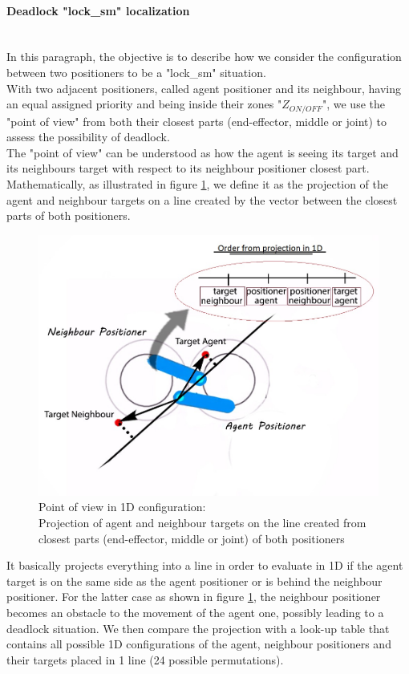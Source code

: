 \documentclass[]{spie}  %
\begin{document}
	\paragraph{Deadlock "lock\_sm" localization}\mbox{}\\
	In this paragraph, the objective is to describe how we consider the configuration between two positioners to be a "lock\_sm" situation.\\
	With two adjacent positioners, called agent positioner and its neighbour, having an equal assigned priority and being inside their zones "$Z_{ON/OFF}$", we use the "point of view" from both their closest parts (end-effector, middle or joint) to assess the possibility of deadlock.\\
	The "point of view" can be understood as how the agent is seeing its target and its neighbours target with respect to its neighbour positioner closest part.
	Mathematically, as illustrated in figure \ref{projection},  we define it as the projection of the agent and neighbour targets on a line created by the vector between the closest parts of both positioners.\\
	\begin{figure}[H]
		\centering
		\includegraphics[scale=0.35]{images/Projection1.jpg}
		\caption{\centering Point of view in 1D configuration:\\
			 Projection of agent and neighbour targets on the line created from closest parts (end-effector, middle or joint) of both positioners}
		\label{projection}
	\end{figure}
	It basically projects everything into a line in order to evaluate in 1D if the agent target is on the same side as the agent positioner or is behind the neighbour positioner. For the latter case as shown in figure \ref{projection}, the neighbour positioner becomes an obstacle to the movement of the agent one, possibly leading to a deadlock situation. We then compare the projection with a look-up table that contains all possible 1D configurations of the agent, neighbour positioners and their targets placed in 1 line (24 possible permutations).\\
\end{document}

